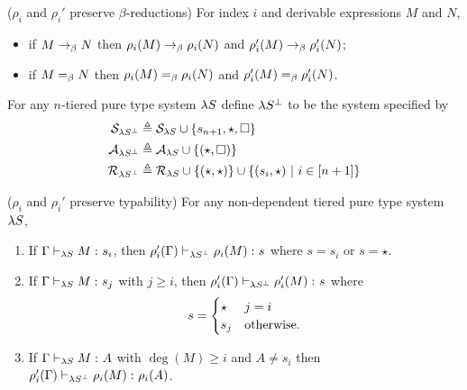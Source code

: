 \documentclass{article}
\begin{document}
\begin{lemma}
\label{lem:rho-beta}
($\rho_i$ and $\rho_i'$ preserve $\beta$-reductions)
For index $i$ and derivable expressions $M$ and $N$,
\begin{itemize}
\item if $M \onestepbeta N$ then $\rho_i(M) \onestepbeta \rho_i(N)$ and $\rho_i'(M) \onestepbeta \rho_i'(N)$;
\item if $M \eqbeta N$ then $\rho_i(M) \eqbeta \rho_i(N)$ and $\rho_i'(M) \eqbeta \rho_i'(N)$.
\end{itemize}
\end{lemma}

\begin{definition}
For any $n$-tiered pure type system $\lS$ define $\lS^\bot$ to be the system specified by
\begin{align*}
  \sorts_{\lS^\bot} &\df \sorts_{\lS} \cup \{s_{n + 1}, \star, \square\} \\
  \axioms_{\lS^\bot} &\df \axioms_{\lS} \cup \{(\star, \square)\} \\
  \rules_{\lS^\bot} &\df \rules_{\lS} \cup \{(\star, \star)\} \cup \setcomp {(s_i, \star)} {i \in \upto {n + 1}}
\end{align*}
\end{definition}

\begin{lemma}
\label{lem:rho-pres-type}
($\rho_i$ and $\rho_i'$ preserve typability) For any non-dependent tiered pure type system $\lS$,
\begin{enumerate}
  \item
    \label{item:rho-preserves-types-i}
    If $\judgment[\lS] \Gamma M s_i$, then $\judgment[\lS^\bot] {\rho_i'(\Gamma)} {\rho_i(M)} s$ where $s = s_i$ or $s = \star$.
  \item
    \label{item:rho-preserves-types-ii}
    If $\judgment[\lS] \Gamma M s_j$ with $j \geq i$, then $\judgment[\lS^\bot] {\rho_i'(\Gamma)} {\rho'_i(M)} s$ where
    \begin{displaymath}
      s =
      \begin{cases}
        \star & j = i \\
        s_j & \ow. \\
      \end{cases}
    \end{displaymath}
  \item
    \label{item:rho-preserves-types-iii}
    If $\judgment[\lS] \Gamma M A$ with $\deg(M) \geq i$ and $A \not = s_i$ then $\judgment[\lS^\bot]{\rho_i'(\Gamma)} {\rho_i(M)} {\rho_i(A)}$.
\end{enumerate}
\end{lemma}
\end{document}

